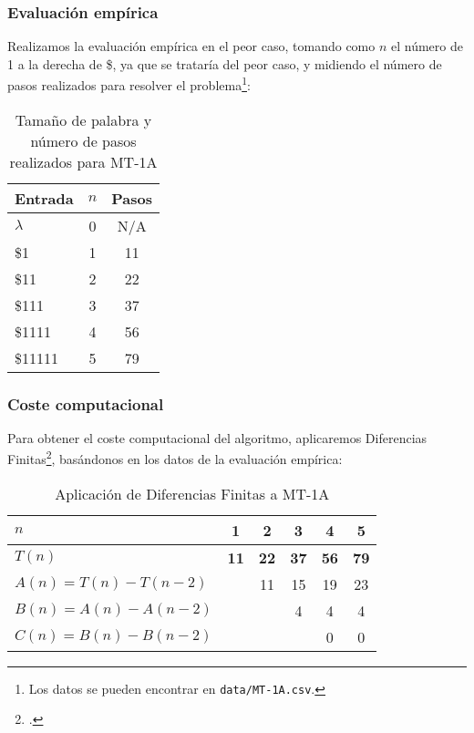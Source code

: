 \subsubsection*{Evaluación empírica}
Realizamos la evaluación empírica en el peor caso, tomando como $n$ el número de 1 a la derecha de \$, ya que se trataría del peor caso, y midiendo el número de pasos realizados para resolver el problema\footnote{Los datos se pueden encontrar en \texttt{data/MT-1A.csv}.}:

\begin{table}[h]
    \centering
    \begin{tabular}{lcc}
        Entrada                & $n$ & Pasos \\
        \hline
        $\lambda$               & 0  & N/A \\
        \$1                     & 1  & 11  \\
        \$11                    & 2  & 22  \\
        \$111                   & 3  & 37  \\
        \$1111                  & 4  & 56  \\
        \$11111                 & 5  & 79  \\
    \end{tabular}
    \caption{Tamaño de palabra y número de pasos realizados para MT-1A}
\end{table}


\subsubsection*{Coste computacional}
Para obtener el coste computacional del algoritmo, aplicaremos Diferencias Finitas\footcite[ver][pgs. 1-42: \textit{Chapter 1. Difference Tables and Polynomial Fits}]{cuoco2005mathematical}, basándonos en los datos de la evaluación empírica:

\begin{table}[h]
    \centering
    \begin{tabular}{|l|c|c|c|c|c|}
        \hline
        $n$ & \textbf{1} & \textbf{2} & \textbf{3} & \textbf{4} & \textbf{5}\\ \hline
        $T(n)$ & \textbf{11} & \textbf{22} & \textbf{37} & \textbf{56} & \textbf{79}      \\ \hline
        \hline
        $A(n) = T(n) - T(n-2)$ &    & 11 & 15 & 19 & 23\\ \hline
        $B(n) = A(n) - A(n-2)$ &    &    &  4 &  4 &  4\\ \hline
        $C(n) = B(n) - B(n-2)$ &    &    &    &  0 &  0 \\ \hline
    \end{tabular}
    \caption{Aplicación de Diferencias Finitas a MT-1A}
\end{table}

